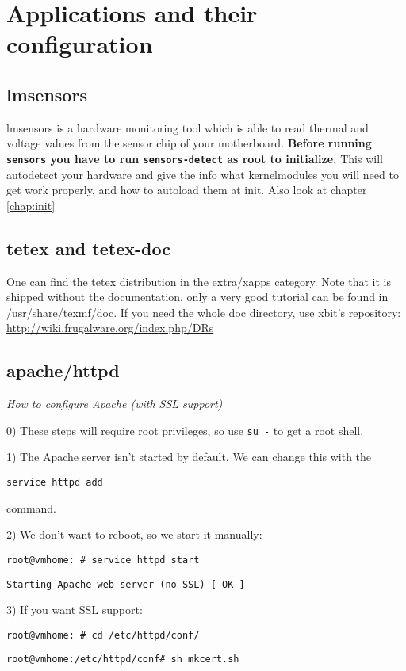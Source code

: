 \chapter{Applications and their configuration}
\section{lmsensors}

lmsensors is a hardware monitoring tool which is able to read thermal and voltage values from the sensor chip of your motherboard.
\textbf{Before running {\tt sensors} you have to run {\tt sensors-detect} as root to initialize.} This will autodetect your hardware and give the info what kernelmodules you will need to get work properly, and how to autoload them at init. Also look at chapter \ref{chap:init}

\section{tetex and tetex-doc}

One can find the tetex distribution in the extra/xapps category. Note that it is shipped without the documentation, only a very good tutorial can be found in /usr/share/texmf/doc.
If you need the whole doc directory, use xbit's repository:
\url{http://wiki.frugalware.org/index.php/DRs}

\section{apache/httpd}

\textit{How to configure Apache (with SSL support)}

0) These steps will require root privileges, so use {\tt su -} to get a root shell.

1) The Apache server isn't started by default. We can change this with the

{\tt service httpd add}

command.

2) We don't want to reboot, so we start it manually:

{\tt root@vmhome:~# service httpd start}

{\tt Starting Apache web server (no SSL)        [  OK  ]}

3) If you want SSL support:

{\tt root@vmhome:~# cd /etc/httpd/conf/}

{\tt root@vmhome:/etc/httpd/conf# sh mkcert.sh}

